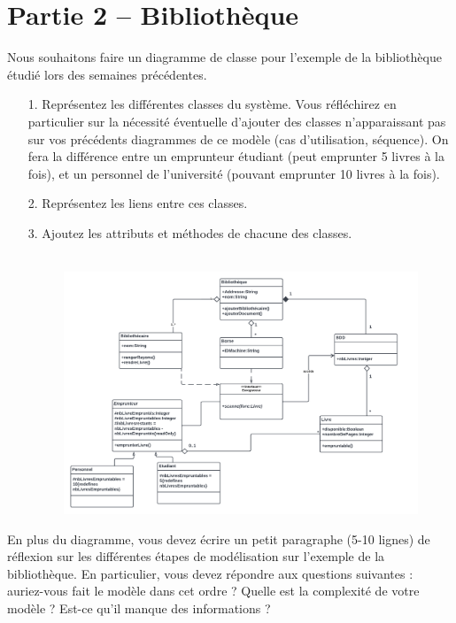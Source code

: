 \documentclass[12pt]{article}
\begin{document}
\section{Partie 2 – Bibliothèque}
Nous souhaitons faire un diagramme de classe pour l’exemple de la bibliothèque étudié lors des
semaines précédentes.
\begin{itemize}
	\item[1. ] Représentez les différentes classes du système. Vous réfléchirez en particulier sur la
	nécessité éventuelle d’ajouter des classes n’apparaissant pas sur vos précédents diagrammes
	de ce modèle (cas d’utilisation, séquence). On fera la différence entre un emprunteur
	étudiant (peut emprunter 5 livres à la fois), et un personnel de l’université (pouvant
	emprunter 10 livres à la fois).
	\item[2. ] Représentez les liens entre ces classes.
	\item[3. ] Ajoutez les attributs et méthodes de chacune des classes.\\
	\\

	
		\begin{figure}[!hbtp]
		\centering
		\includegraphics[scale=0.62]{Capture2_s.png}
	\end{figure}

\end{itemize}
		
	En plus du diagramme, vous devez écrire un petit paragraphe (5-10 lignes) de réflexion sur les
	différentes étapes de modélisation sur l’exemple de la bibliothèque. En particulier, vous devez
	répondre aux questions suivantes : auriez-vous fait le modèle dans cet ordre ? Quelle est la
	complexité de votre modèle ? Est-ce qu’il manque des informations ?\\
	 \\
\end{document}
